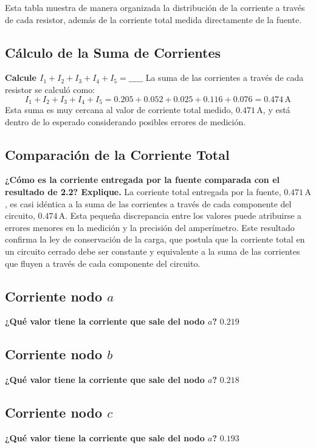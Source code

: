 Esta tabla muestra de manera organizada la distribución de la corriente a través de cada resistor, además de la corriente total medida directamente de la fuente.

\subsection{Cálculo de la Suma de Corrientes}
\textbf{Calcule \(I_1 + I_2 + I_3 + I_4 + I_5 = \_\_\_\_\_ \)}
La suma de las corrientes a través de cada resistor se calculó como:
\[
I_1 + I_2 + I_3 + I_4 + I_5 = 0.205 + 0.052 + 0.025 + 0.116 + 0.076 = 0.474 \, \text{A}
\]
Esta suma es muy cercana al valor de corriente total medido, \(0.471 \, \text{A}\), y está dentro de lo esperado considerando posibles errores de medición.

\subsection{Comparación de la Corriente Total}
\textbf{¿Cómo es la corriente entregada por la fuente comparada con el resultado de 2.2? Explique.}
La corriente total entregada por la fuente, \(0.471 \, \text{A}\), es casi idéntica a la suma de las corrientes a través de cada componente del circuito, \(0.474 \, \text{A}\). Esta pequeña discrepancia entre los valores puede atribuirse a errores menores en la medición y la precisión del amperímetro. Este resultado confirma la ley de conservación de la carga, que postula que la corriente total en un circuito cerrado debe ser constante y equivalente a la suma de las corrientes que fluyen a través de cada componente del circuito.

\subsection{Corriente nodo $a$}
\textbf{¿Qué valor tiene la corriente que sale del nodo $a$?} \underline{$0.219$}


\subsection{Corriente nodo $b$}
\textbf{¿Qué valor tiene la corriente que sale del nodo $a$?} \underline{$0.218$}


\subsection{Corriente nodo $c$}
\textbf{¿Qué valor tiene la corriente que sale del nodo $a$?} \underline{$0.193$}


